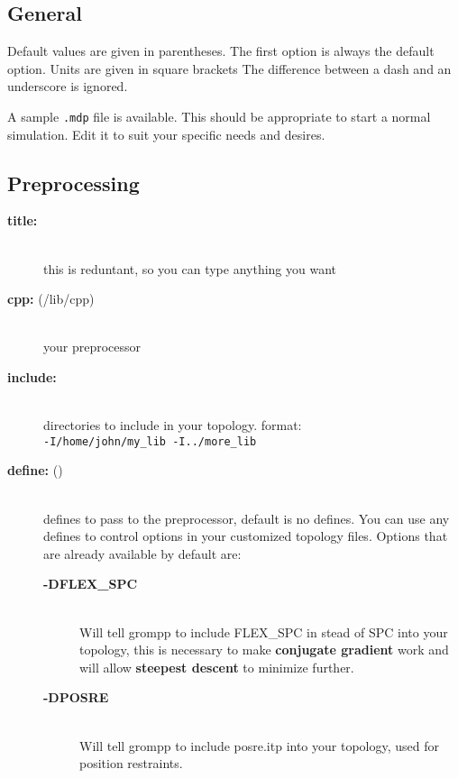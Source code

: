 \subsection{General}

Default values are given in parentheses. The first option is
always the default option. Units are given in square brackets The
difference between a dash and an underscore is ignored. 

A sample {\tt .mdp} file is
available. This should be appropriate to start a normal
simulation. Edit it to suit your specific needs and desires. 

\subsection{Preprocessing}
\begin{description}
\item[{\bf title:}]\mbox{}\\
this is reduntant, so you can type anything you want
\item[{\bf cpp: }(/lib/cpp)]\mbox{}\\
your preprocessor
\item[{\bf include:}]\mbox{}\\
directories to include in your topology. format: 
\\{\tt-I/home/john/my\_lib -I../more\_lib}\\
\item[{\bf define: }()]\mbox{}\\
defines to pass to the preprocessor, default is no defines. You can use
any defines to control options in your customized topology files. Options
that are already available by default are:
\vspace{-2ex}\begin{description}
\item[{\bf -DFLEX\_SPC}]\mbox{}\\
Will tell grompp to include FLEX\_SPC in stead of SPC into your
topology, this is necessary to make 
{\bf conjugate gradient} work and will allow 
{\bf steepest descent} to minimize further.
\item[{\bf -DPOSRE}]\mbox{}\\
Will tell grompp to include posre.itp into your topology, used for
position restraints.
\end{description}
\end{description}

